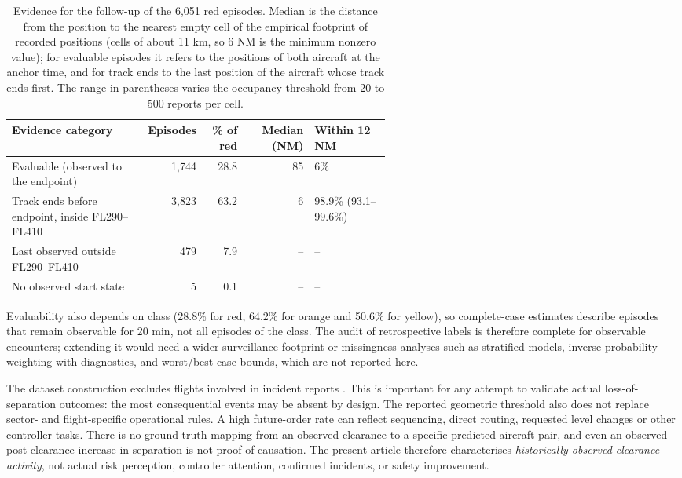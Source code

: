 \documentclass[pdflatex,sn-mathphys-num]{sn-jnl}
\begin{document}
\begin{table}[tbp]
\caption{Evidence for the follow-up of the 6,051 red episodes. Median is the distance from the position to the nearest empty cell of the empirical footprint of recorded positions (cells of about 11 km, so 6 NM is the minimum nonzero value); for evaluable episodes it refers to the positions of both aircraft at the anchor time, and for track ends to the last position of the aircraft whose track ends first. The range in parentheses varies the occupancy threshold from 20 to 500 reports per cell.}\label{tab:evidence}
\centering\small\setlength{\tabcolsep}{4pt}
\begin{tabular}{@{}p{0.36\linewidth}rrrp{0.2\linewidth}@{}}
\toprule
Evidence category & Episodes & \% of red & Median (NM) & Within 12 NM\\
\midrule
Evaluable (observed to the endpoint) & 1,744 & 28.8 & 85 & 6\%\\
Track ends before endpoint, inside FL290--FL410 & 3,823 & 63.2 & 6 & 98.9\% (93.1--99.6\%)\\
Last observed outside FL290--FL410 & 479 & 7.9 & -- & --\\
No observed start state & 5 & 0.1 & -- & --\\
\bottomrule
\end{tabular}
\end{table}

Evaluability also depends on class (28.8\% for red, 64.2\% for orange and 50.6\% for yellow), so complete-case estimates describe episodes that remain observable for 20 min, not all episodes of the class. The audit of retrospective labels is therefore complete for observable encounters; extending it would need a wider surveillance footprint or missingness analyses such as stratified models, inverse-probability weighting \cite{seaman2013} with diagnostics, and worst/best-case bounds, which are not reported here.

The dataset construction excludes flights involved in incident reports \cite{nilsson2023}. This is important for any attempt to validate actual loss-of-separation outcomes: the most consequential events may be absent by design. The reported geometric threshold also does not replace sector- and flight-specific operational rules. A high future-order rate can reflect sequencing, direct routing, requested level changes or other controller tasks. There is no ground-truth mapping from an observed clearance to a specific predicted aircraft pair, and even an observed post-clearance increase in separation is not proof of causation. The present article therefore characterises \emph{historically observed clearance activity}, not actual risk perception, controller attention, confirmed incidents, or safety improvement.
\end{document}
